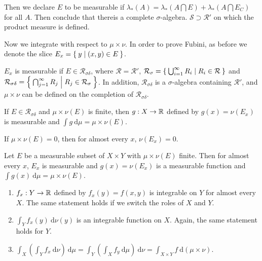 \documentclass[10pt, twoside]{article}
\renewcommand{\d}{\ \mathrm{d}}
\begin{document}
    Then we declare $E$ to be measurable if $\lambda_*(A) = \lambda_*(A \bigcap E) + \lambda_*(A \bigcap E_C)$ for all $A$. Then conclude that thereis a complete $\sigma$-algebra. $\mathcal{S} \supset \mathcal{R'}$ on which the product measure is defined.

    Now we integrate with respect to $\mu \times \nu$. In order to prove Fubini, as before we denote the slice $E_x = \Set{y | (x,y) \in E}$.

    \begin{lem}
        $E_x$ is measurable if $E \in \mathcal{R}_{\sigma\delta}$, where $\mathcal{R} = \mathcal{R'}$, $\mathcal{R}_{\sigma} = \Set{\bigcup _{i=1}^{\infty} R_i | R_i \in \mathcal{R}}$ and $\mathcal{R}_{\sigma\delta} = \Set{\bigcap_{j=1}^{\infty} R_j | R_j \in \mathcal{R}_{\sigma}}$. In addition, $\mathcal{R}_{\sigma\delta}$ is a $\sigma$-algebra containing $\mathcal{R'}$, and $\mu \times \nu$ can be defined on the completion of $\mathcal{R}_{\sigma\delta}$.
    \end{lem}

    \begin{lem}
        If $E \in \mathcal{R}_{\sigma\delta}$ and $\mu \times \nu(E)$ is finite, then $g:X \rightarrow \mathbb{R}$ defined by $g(x) = \nu(E_x)$ is measurable and $\int g \d\mu = \mu\times\nu(E)$.
    \end{lem}

    \begin{lem}
        If $\mu \times\nu(E)=0$, then for almost every $x$, $\nu(E_x) = 0$.
    \end{lem}

    \begin{thm}
        Let $E$ be a measurable subset of $X \times Y$ with $\mu \times\nu(E)$ finite. Then for almost every $x$, $E_x$ is measurable and $g(x) = \nu(E_x)$ is a measurable function and $\int g(x) \d \mu = \mu\times\nu(E)$.
    \end{thm}

    \begin{thm}[Fubini]
        \begin{enumerate}
            \item $f_x:Y \rightarrow \mathbb{R}$ defined by $f_x(y) = f(x,y)$ is integrable on $Y$ for almost every $X$. The same statement holds if we switch the roles of $X$ and $Y$.
            \item $\int_Y f_x(y) \d\nu(y)$ is an integrable function on $X$. Again, the same statement holds for $Y$.
            \item $\int_X \left(\int_Y f_x \d\nu\right)\d\mu = \int_Y \left(\int_X f_y \d\mu\right)\d\nu = \int_{X \times Y} f \d(\mu\times\nu)$.
        \end{enumerate}
    \end{thm}
\end{document}
